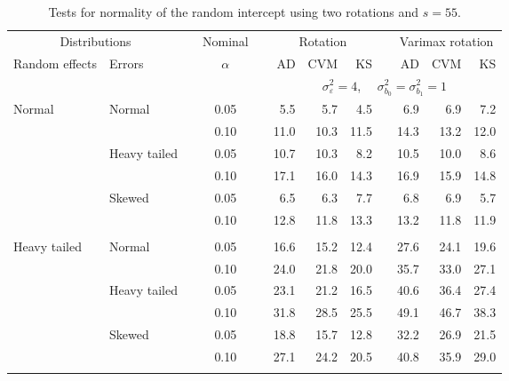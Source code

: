 \begin{table}[ht]
\caption{\label{tab:simb0s55-alt}Tests for normality of the random intercept using two rotations and $s = 55$.}
\begin{scriptsize}
\begin{center}
\begin{tabular}{ll p{.1cm} c p{.1cm} rrr p{.1cm} rrr}
  \hline
  \multicolumn{2}{c}{Distributions}& & Nominal & &  \multicolumn{3}{c}{Rotation} & & \multicolumn{3}{c}{Varimax rotation} \\ \cline{1-2} \cline{6-8} \cline{10-12}   
  Random effects & Errors & & $\alpha$ & & AD & CVM & KS & & AD & CVM & KS \\ 
   \hline
& && && \multicolumn{7}{c}{$\sigma_{\varepsilon}^2 = 4$, \ \ $\sigma_{b_0}^2 = \sigma_{b_1}^2 = 1$} \\ \cline{6-12}
\rowcolor{gray!20}Normal       & Normal       && 0.05 &&   5.5 & 5.7 & 4.5 &   & 6.9 & 6.9 & 7.2 \\ 
\rowcolor{gray!20}             &              && 0.10 &&   11.0 & 10.3 & 11.5 &   & 14.3 & 13.2 & 12.0 \\ 
\rowcolor{gray!20}             & Heavy tailed && 0.05 &&   10.7 & 10.3 & 8.2 &   & 10.5 & 10.0 & 8.6 \\ 
\rowcolor{gray!20}             &              && 0.10 &&   17.1 & 16.0 & 14.3 &   & 16.9 & 15.9 & 14.8 \\ 
\rowcolor{gray!20}             & Skewed       && 0.05 &&   6.5 & 6.3 & 7.7 &   & 6.8 & 6.9 & 5.7 \\ 
\rowcolor{gray!20}             &              && 0.10 &&   12.8 & 11.8 & 13.3 &   & 13.2 & 11.8 & 11.9 \\ 
&&&&&&&&&&&\\
Heavy tailed & Normal       && 0.05 &&   16.6 & 15.2 & 12.4 &   & 27.6 & 24.1 & 19.6 \\ 
             &              && 0.10 &&   24.0 & 21.8 & 20.0 &   & 35.7 & 33.0 & 27.1 \\ 
             & Heavy tailed && 0.05 &&   23.1 & 21.2 & 16.5 &   & 40.6 & 36.4 & 27.4 \\ 
             &              && 0.10 &&   31.8 & 28.5 & 25.5 &   & 49.1 & 46.7 & 38.3 \\ 
             & Skewed       && 0.05 &&   18.8 & 15.7 & 12.8 &   & 32.2 & 26.9 & 21.5 \\ 
             &              && 0.10 &&   27.1 & 24.2 & 20.5 &   & 40.8 & 35.9 & 29.0 \\ 
&&&&&&&&&&&\\

\end{tabular}
\end{center}
\end{scriptsize}
\end{table}
